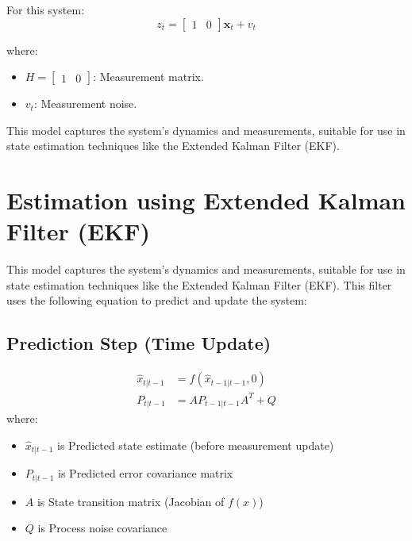 \documentclass{article}
\begin{document}
For this system:
\[
z_t =
\begin{bmatrix}
1 & 0
\end{bmatrix}
\mathbf{x}_t + v_t
\]

where:
\begin{itemize}
    \item \( H = \begin{bmatrix} 1 & 0 \end{bmatrix} \): Measurement matrix.
    \item \( v_t \): Measurement noise.
\end{itemize}

This model captures the system's dynamics and measurements, suitable for use in state estimation techniques like the Extended Kalman Filter (EKF).


\section*{Estimation using Extended Kalman Filter (EKF)}

This model captures the system's dynamics and measurements, suitable for use in state estimation techniques like the Extended Kalman Filter (EKF). This filter uses the following equation to predict and update the system: 
\subsection*{Prediction Step (Time Update)}
\begin{align*}
\hat{x}_{t|t-1} &= f(\hat{x}_{t-1|t-1}, 0) \\
P_{t|t-1} &= A P_{t-1|t-1} A^T + Q
\end{align*}
where: 
\begin{itemize}
    \item \( \hat{x}_{t|t-1} \) is Predicted state estimate (before measurement update)
    \item \( P_{t|t-1} \) is Predicted error covariance matrix
    \item \( A \) is State transition matrix (Jacobian of \( f(x) \))
    \item \( Q \) is Process noise covariance
\end{itemize}
\end{document}
